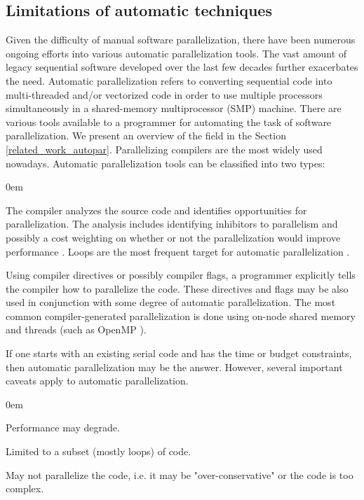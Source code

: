 \subsection{Limitations of automatic techniques}
\label{background_challenges_automatic}
\quad Given the difficulty of manual software parallelization, there have been numerous ongoing efforts into various automatic parallelization tools. The vast amount of legacy sequential software developed over the last few decades further exacerbates the need. Automatic parallelization refers to converting sequential code into multi-threaded and/or vectorized code in order to use multiple processors simultaneously in a shared-memory multiprocessor (SMP) machine.\newline\null
\quad There are various tools available to a programmer for automating the task of software parallelization. We present an overview of the field in the Section \ref{related_work_autopar}. Parallelizing compilers are the most widely used nowadays. Automatic parallelization tools can be classified into two types:
\begin{description}[style=unboxed,leftmargin=0cm,noitemsep]
\itemsep0em
\item[Fully Automatic] The compiler analyzes the source code and identifies opportunities for parallelization. The analysis includes identifying inhibitors to parallelism and possibly a cost weighting on whether or not the parallelization would improve performance \cite{Kennedy:2001:OCM:502981}. Loops are the most frequent target for automatic parallelization \cite{Bacon:1994:CTH:197405.197406}.
\item[Programmer Directed] Using compiler directives or possibly compiler flags, a programmer explicitly tells the compiler how to parallelize the code. These directives and flags may be also used in conjunction with some degree of automatic parallelization. The most common compiler-generated parallelization is done using on-node shared memory and threads (such as OpenMP \cite{Dagum:1998:OIA:615255.615542}).
\end{description}
\quad If one starts with an existing serial code and has the time or budget constraints, then automatic parallelization may be the answer. However, several important caveats apply to automatic parallelization.
\begin{description}[style=unboxed,leftmargin=0cm]
\itemsep0em
\item[Performance] Performance may degrade.
\item[Limitations] Limited to a subset (mostly loops) of code.
\item[Effectiveness] May not parallelize the code, i.e. it may be "over-conservative" or the code is too complex.
\end{description}
